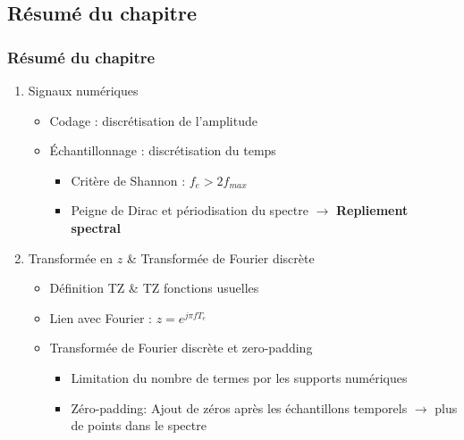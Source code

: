 \documentclass{beamer}
\begin{document}
\subsection{Résumé du chapitre}
\begin{frame}

\frametitle{Résumé du chapitre}
\begin{enumerate}
\item Signaux numériques
\vspace{0.2cm} 
\begin{itemize}
\item<3->  Codage : discrétisation de l'amplitude 
\vspace{0.3cm}
\item<4->  \'Echantillonnage : discrétisation du temps
\vspace{0.3cm}
\begin{itemize} 
\item  Critère de Shannon : $f_e > 2 f_{max}$
\vspace{0.3cm}
\item  Peigne de Dirac et périodisation du spectre $\rightarrow$ \textbf{Repliement spectral}
\end{itemize} 
\end{itemize}
\vspace{0.3cm}
\item<2-> Transformée en $z$ \& Transformée de Fourier discrète
\vspace{0.2cm} 
\begin{itemize}
\item<5->  Définition TZ \& TZ fonctions usuelles 
\vspace{0.3cm} 
\item<6->  Lien avec Fourier : $z = e^{j \pi f T_e}$
\vspace{0.3cm}
\item<7->  Transformée de Fourier discrète et zero-padding
\begin{itemize} 
\item  Limitation du nombre de termes por les supports numériques
\vspace{0.15cm}
\item  Zéro-padding: Ajout de zéros après les échantillons temporels $\rightarrow$ plus de points dans le spectre
\end{itemize} 
\end{itemize}
\end{enumerate}

\end{frame}
\end{document}
